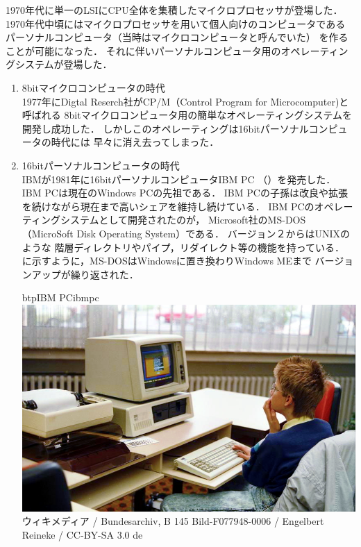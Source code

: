 1970年代に単一のLSIにCPU全体を集積したマイクロプロセッサが登場した．
1970年代中頃にはマイクロプロセッサを用いて個人向けのコンピュータである
パーソナルコンピュータ（当時はマイクロコンピュータと呼んでいた）
を作ることが可能になった．
それに伴いパーソナルコンピュータ用のオペレーティングシステムが登場した．

\begin{enumerate}
\item 8bitマイクロコンピュータの時代 \\
  1977年にDigtal Reserch社がCP/M（Control Program for Microcomputer)と呼ばれる
    8bitマイクロコンピュータ用の簡単なオペレーティングシステムを
    開発し成功した．
    しかしこのオペレーティングは16bitパーソナルコンピュータの時代には
    早々に消え去ってしまった\cite{fourth}．

  \item 16bitパーソナルコンピュータの時代 \\
    IBMが1981年に16bitパーソナルコンピュータIBM PC\cite{ibmpc81}
    （）を発売した．
    IBM PCは現在のWindows PCの先祖である．
    IBM PCの子孫は改良や拡張を続けながら現在まで高いシェアを維持し続けている．
    IBM PCのオペレーティングシステムとして開発されたのが，
    Microsoft社のMS-DOS（MicroSoft Disk Operating System）\cite{msdos}である．
    バージョン２からはUNIXのような
    階層ディレクトリやパイプ，リダイレクト等の機能を持っている．
    に示すように，MS-DOSはWindowsに置き換わりWindows MEまで
    バージョンアップが繰り返された．

    \begin{myfig}{btp}{IBM PC}{ibmpc}
      \includegraphics[scale=0.35]
                      {Photo/Bundesarchiv_B_145_Bild-F077948-0006,_Jugend-Computerschule_mit_IBM-PC.jpg}\\
                      {\small
                        ウィキメディア /
                        Bundesarchiv, B 145 Bild-F077948-0006 /
                        Engelbert Reineke / CC-BY-SA 3.0 de}
    \end{myfig}


\end{enumerate}
